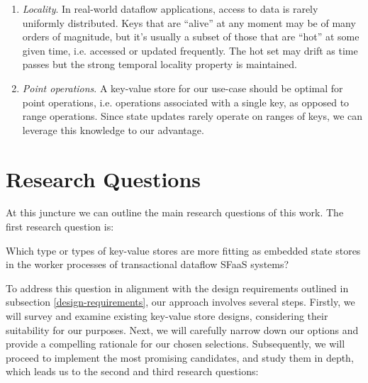 \begin{enumerate}
    \item \textit{Locality}.
    In real-world dataflow applications, access to data is rarely uniformly distributed.
    Keys that are ``alive'' at any moment may be of many orders of magnitude, but it's usually a subset of those that are ``hot'' at some given time, i.e. accessed or updated frequently.
    The hot set may drift as time passes but the strong temporal locality property is maintained.

    \item \textit{Point operations}.
    A key-value store for our use-case should be optimal for point operations, i.e. operations associated with a single key, as opposed to range operations.
    Since state updates rarely operate on ranges of keys, we can leverage this knowledge to our advantage.

\end{enumerate}

\section{Research Questions}
\label{section-reseach-questions}

At this juncture we can outline the main research questions of this work. The first research question is:\\

\begin{tcolorbox}
    Which type or types of key-value stores are more fitting as embedded state stores in the worker processes of transactional dataflow SFaaS systems?
\end{tcolorbox}

\vspace{8px}
To address this question in alignment with the design requirements outlined in subsection \ref{design-requirements}, our approach involves several steps.
Firstly, we will survey and examine existing key-value store designs, considering their suitability for our purposes.
Next, we will carefully narrow down our options and provide a compelling rationale for our chosen selections.
Subsequently, we will proceed to implement the most promising candidates, and study them in depth, which leads us to the second and third research questions:\\

